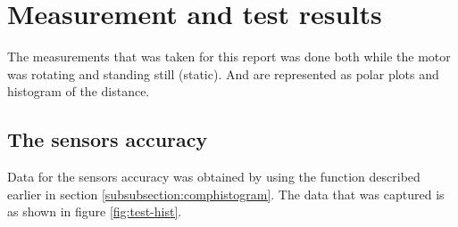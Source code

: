 
%

\section{Measurement and test results}\label{secition:results}
The measurements that was taken for this report was done both while the motor was rotating and standing still (static). And are represented as polar plots and histogram of the distance.



\subsection{The sensors accuracy}\label{subsubsection:accuracy}
Data for the sensors accuracy was obtained by using the function described earlier in section \ref{subsubsection:comphistogram}. The data that was captured is as shown in figure \ref{fig:test-hist}.


